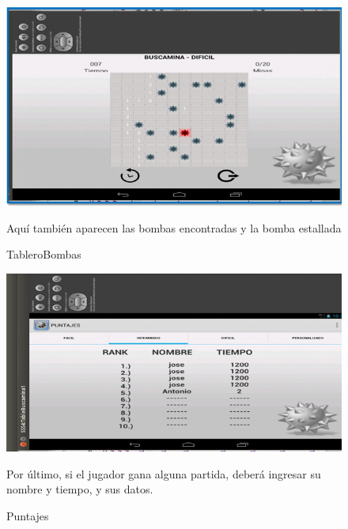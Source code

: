 \begin{figure}[htbp]
\begin{center}
\includegraphics[width=.70\textwidth]{./imagenes/tableroBombas.png}
\caption{TableroBombas}
\end{center}
Aquí también aparecen las bombas encontradas  y la bomba estallada
\end{figure}

\begin{figure}[htbp]
\begin{center}
\includegraphics[width=.70\textwidth]{./imagenes/puntajes.png}
\caption{Puntajes}
\end{center}

Por último, si el jugador gana alguna partida, deberá ingresar su nombre y tiempo, y sus datos.
\end{figure}
